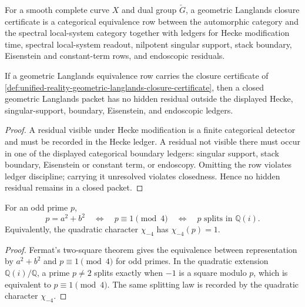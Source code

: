 \begin{definition}
\label{def:unified-reality-geometric-langlands-closure-certificate}
For a smooth complete curve $X$ and dual group $\check G$, a geometric
Langlands closure certificate is a categorical equivalence row between
the automorphic category and the spectral local-system category together
with ledgers for Hecke modification time, spectral local-system readout,
nilpotent singular support, stack boundary, Eisenstein and constant-term
rows, and endoscopic residuals.
\end{definition}

\begin{theorem}
\label{thm:unified-reality-geometric-langlands-no-hidden-residual}
If a geometric Langlands equivalence row carries the closure certificate
of \autoref{def:unified-reality-geometric-langlands-closure-certificate},
then a closed geometric Langlands packet has no hidden residual outside
the displayed Hecke, singular-support, boundary, Eisenstein, and
endoscopic ledgers.
\end{theorem}
\begin{proof}
A residual visible under Hecke modification is a finite categorical
detector and must be recorded in the Hecke ledger. A residual not visible
there must occur in one of the displayed categorical boundary ledgers:
singular support, stack boundary, Eisenstein or constant term, or
endoscopy. Omitting the row violates ledger discipline; carrying it
unresolved violates closedness. Hence no hidden residual remains in a
closed packet.
\end{proof}

\begin{theorem}
\label{thm:unified-reality-quadratic-splitting-langlands-seed}
For an odd prime $p$,
$$
p=a^2+b^2
\quad\Longleftrightarrow\quad
p\equiv 1\pmod 4
\quad\Longleftrightarrow\quad
p\text{ splits in }\mathbb Q(i).
$$
Equivalently, the quadratic character $\chi_{-4}$ has
$\chi_{-4}(p)=1$.
\end{theorem}
\begin{proof}
Fermat's two-square theorem gives the equivalence between representation
by $a^2+b^2$ and $p\equiv 1\pmod 4$ for odd primes. In the quadratic
extension $\mathbb Q(i)/\mathbb Q$, a prime $p\ne2$ splits exactly when
$-1$ is a square modulo $p$, which is equivalent to $p\equiv 1\pmod 4$.
The same splitting law is recorded by the quadratic character
$\chi_{-4}$.
\end{proof}

